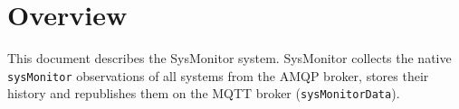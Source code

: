 \documentclass[a4paper]{arrowhead}
\begin{document}
\sloppy

\ArrowheadSetup

\begin{center}
  \vspace*{1cm}
  \huge{\arrowtitle}

  \vspace*{0.2cm}
  \LARGE{\arrowtype}
  \vspace*{1cm}

  \vspace*{\fill}


  \vspace*{1cm}
  \vspace*{\fill}

  \begin{abstract}
    This document describes the SysMonitor support system of the Eclipse Arrowhead 5.2.2 framework, as implemented in \texttt{ah5-SysMonitor-java-spring} with an independent local-cloud deployment definition in its own folder.
  \end{abstract}

  \vspace*{1cm}
\end{center}

\newpage

\tableofcontents
\newpage

\section{Overview}
\label{sec:overview}

This document describes the SysMonitor system. SysMonitor collects the native \texttt{sysMonitor} observations of all systems from the AMQP broker, stores their history and republishes them on the MQTT broker (\texttt{sysMonitorData}).
\end{document}
